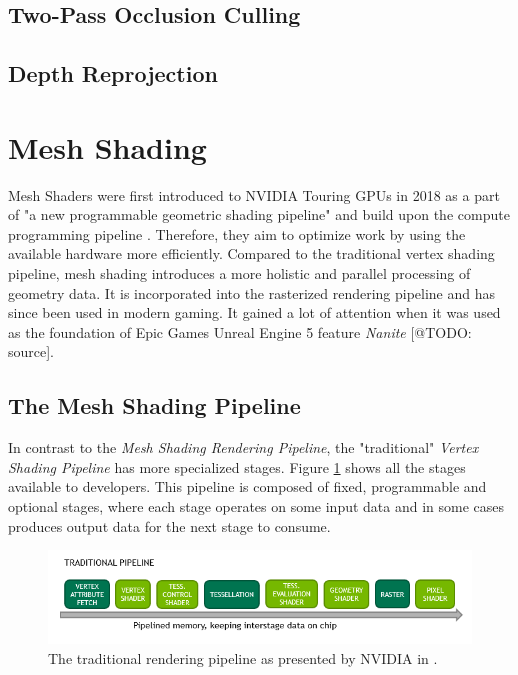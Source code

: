 \subsection{Two-Pass Occlusion Culling} \label{subsec-two-pass-occlusion-culling}


\subsection{Depth Reprojection} \label{subsec-depth-reprojection}

\section{Mesh Shading}  \label{sec-mesh-shading}

Mesh Shaders were first introduced to NVIDIA Touring \ac{GPU}s in 2018 as a part of
"a new programmable geometric shading pipeline" and build upon the compute programming 
pipeline \cite{Kubisch2018}. Therefore, they aim to optimize work by 
using the available hardware more efficiently. Compared to the traditional vertex shading 
pipeline, mesh shading introduces a more holistic and parallel processing of geometry data.
It is incorporated into the rasterized rendering pipeline and has since been used in modern 
gaming. It gained a lot of attention when it was used as the foundation of Epic Games 
Unreal Engine 5 feature \emph{Nanite} [@TODO: source].\\

\subsection{The Mesh Shading Pipeline} \label{subsec-the-mesh-shading-pipeline}

In contrast to the \emph{Mesh Shading Rendering Pipeline}, the "traditional" \emph{Vertex Shading Pipeline} 
has more specialized stages. Figure \ref{fig:traditional-rendering-pipeline} shows all the stages available 
to developers. This pipeline is composed of fixed, programmable and optional stages, where each 
stage operates on some input data and in some cases produces output data for the next stage to consume.\\

\begin{figure}[h]
    \centering
    \includegraphics[width=\linewidth]{images/graphics/traditional-rendering-pipeline.png}
    \caption{The traditional rendering pipeline as presented by NVIDIA in \cite{Kubisch2018}.}
    \label{fig:traditional-rendering-pipeline}
\end{figure}

